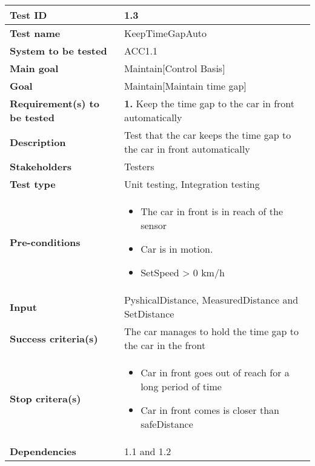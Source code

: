 	\begin{table}[H]
		\begin{tabular}{| p{4cm} | p{10cm} |}
		\hline
		\rowcolor{gray}
			\hline
			\rowcolor{gray}
			{\bf Test ID} & 1.3 \\ \hline
			{\bf Test name} & KeepTimeGapAuto \\ \hline
			{\bf System to be tested} & ACC1.1\\ \hline
			{\bf Main goal} & Maintain[Control Basis] \\ \hline
			{\bf Goal} & Maintain[Maintain time gap] \\ \hline
			{\bf Requirement(s) to be tested} & {\bf 1.} Keep the time gap to the car 
			in front automatically\\ \hline
			{\bf Description} & Test that the car keeps the time gap to the car in 
			front automatically\\ \hline
			{\bf Stakeholders} & Testers\\ \hline
			{\bf Test type} &  Unit testing, Integration testing \\ \hline
			{\bf Pre-conditions} & 
				\begin{itemize}
					\item The car in front is in reach of the sensor 
					\item Car is in motion.
					\item SetSpeed > 0 km/h
				\end{itemize}\\ \hline
			{\bf Input} & PyshicalDistance, MeasuredDistance and SetDistance\\ \hline
			{\bf Success criteria(s)}& The car manages to hold the time gap to the car 
			in the front\\ \hline
			{\bf Stop critera(s)} &  
				\begin{itemize}
					\item Car in front goes out of reach for a long period of time
					\item Car in front comes is closer than safeDistance
				\end{itemize}\\ \hline
			{\bf Dependencies} & 1.1 and 1.2\\ \hline
		\end{tabular}
	\end{table}

